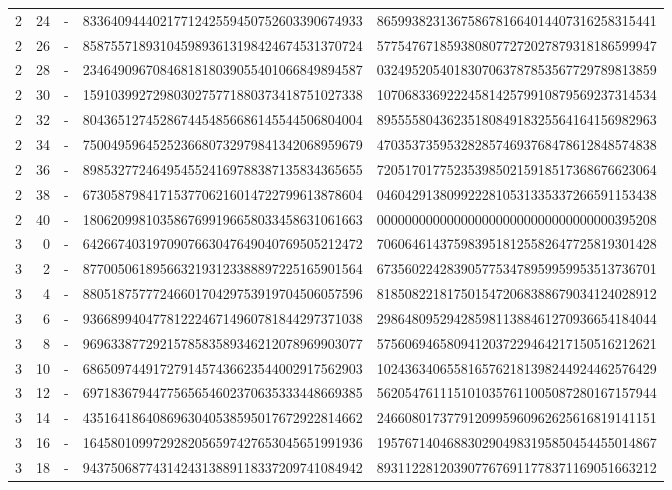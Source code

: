 \begin{longtable}{rrrll}
2 & 24 & - & 8336409444021771242559450752603390674933 & 8659938231367586781664014407316258315441 \\
2 & 26 & - & 8587557189310459893613198424674531370724 & 5775476718593808077272027879318186599947 \\
2 & 28 & - & 2346490967084681818039055401066849894587 & 0324952054018307063787853567729789813859 \\
2 & 30 & - & 1591039927298030275771880373418751027338 & 1070683369222458142579910879569237314534 \\
2 & 32 & - & 8043651274528674454856686145544506804004 & 8955558043623518084918325564164156982963 \\
2 & 34 & - & 7500495964525236680732979841342068959679 & 4703537359532828574693768478612848574838 \\
2 & 36 & - & 8985327724649545524169788387135834365655 & 7205170177523539850215918517368676623064 \\
2 & 38 & - & 6730587984171537706216014722799613878604 & 0460429138099222810531335337266591153438 \\
2 & 40 & - & 1806209981035867699196658033458631061663 & 0000000000000000000000000000000000395208 \\
3 & 0 & - & 6426674031970907663047649040769505212472 & 7060646143759839518125582647725819301428 \\
3 & 2 & - & 8770050618956632193123388897225165901564 & 6735602242839057753478959959953513736701 \\
3 & 4 & - & 8805187577724660170429753919704506057596 & 8185082218175015472068388679034124028912 \\
3 & 6 & - & 9366899404778122246714960781844297371038 & 2986480952942859811388461270936654184044 \\
3 & 8 & - & 9696338772921578583589346212078969903077 & 5756069465809412037229464217150516212621 \\
3 & 10 & - & 6865097449172791457436623544002917562903 & 1024363406558165762181398244924462576429 \\
3 & 12 & - & 6971836794477565654602370635333448669385 & 5620547611151010357611005087280167157944 \\
3 & 14 & - & 4351641864086963040538595017672922814662 & 2466080173779120995960962625616819141151 \\
3 & 16 & - & 1645801099729282056597427653045651991936 & 1957671404688302904983195850454455014867 \\
3 & 18 & - & 9437506877431424313889118337209741084942 & 8931122812039077676911778371169051663212 \\

\end{longtable}
